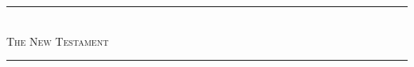 \fancyhead[RE,LO]{}
\fancyhead[LE,RO]{}
\onecolumn
\vspace*{50ex}
\begin{center}
	\rule{15em}{.25mm}\\
	\vspace{1.5ex}
	{\Large{\scshape The New Testament}}
	\par
	\rule{15em}{.25mm}
\end{center}
\vfill
\twocolumn